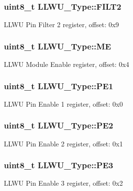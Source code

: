 \subsubsection[{\texorpdfstring{F\+I\+L\+T2}{FILT2}}]{ uint8\+\_\+t L\+L\+W\+U\+\_\+\+Type\+::\+F\+I\+L\+T2}\hypertarget{structLLWU__Type_a5736205996ff7fc8e4eba49f8f0e44ea}{}\label{structLLWU__Type_a5736205996ff7fc8e4eba49f8f0e44ea}
L\+L\+WU Pin Filter 2 register, offset\+: 0x9 
\subsubsection[{\texorpdfstring{ME}{ME}}]{ uint8\+\_\+t L\+L\+W\+U\+\_\+\+Type\+::\+ME}\hypertarget{structLLWU__Type_aded2b9c734957e9882cefccb5029c51f}{}\label{structLLWU__Type_aded2b9c734957e9882cefccb5029c51f}
L\+L\+WU Module Enable register, offset\+: 0x4 
\subsubsection[{\texorpdfstring{P\+E1}{PE1}}]{ uint8\+\_\+t L\+L\+W\+U\+\_\+\+Type\+::\+P\+E1}\hypertarget{structLLWU__Type_af4e20147909cf3d6a8ec04750fc36833}{}\label{structLLWU__Type_af4e20147909cf3d6a8ec04750fc36833}
L\+L\+WU Pin Enable 1 register, offset\+: 0x0 
\subsubsection[{\texorpdfstring{P\+E2}{PE2}}]{ uint8\+\_\+t L\+L\+W\+U\+\_\+\+Type\+::\+P\+E2}\hypertarget{structLLWU__Type_a95ff50f29c9dd8bb33ab20a0cbb24a67}{}\label{structLLWU__Type_a95ff50f29c9dd8bb33ab20a0cbb24a67}
L\+L\+WU Pin Enable 2 register, offset\+: 0x1 
\subsubsection[{\texorpdfstring{P\+E3}{PE3}}]{ uint8\+\_\+t L\+L\+W\+U\+\_\+\+Type\+::\+P\+E3}\hypertarget{structLLWU__Type_aea83255d229cf9f16973c2e2c289d084}{}\label{structLLWU__Type_aea83255d229cf9f16973c2e2c289d084}
L\+L\+WU Pin Enable 3 register, offset\+: 0x2 
